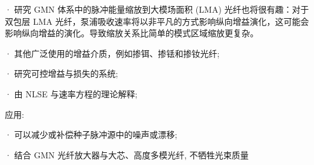 \documentclass[14pt,a4paper,oneside]{article}
\begin{document}
· 研究 GMN 体系中的脉冲能量缩放到大模场面积 (LMA) 光纤也将很有趣：对于双包层 LMA 光纤，泵浦吸收速率将以非平凡的方式影响纵向增益演化，这可能会影响纵向增益的演化。导致缩放关系比简单的模式区域缩放更复杂。

· 其他广泛使用的增益介质，例如掺铒、掺铥和掺钕光纤;

· 研究可控增益与损失的系统;

· 由 NLSE 与速率方程的理论解释;

应用: 

· 可以减少或补偿种子脉冲源中的噪声或漂移;

· 结合 GMN 光纤放大器与大芯、高度多模光纤, 不牺牲光束质量



\newpage

\clearpage           %
{}      %
{}   %


\end{document}
